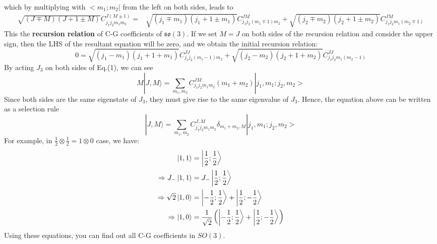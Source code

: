 \documentclass{article}
\begin{document}
	which by multiplying with $< m_{1} ;m_{2}| $ from the left on both sides, leads to
	\begin{equation*}
		\begin{aligned}
			\sqrt{(J\mp M)(J+1\pm M)} C_{j_{1} j_{2} m_{1} m_{2}}^{J(M\pm 1)} = & \sqrt{( j_{1} \mp m_{1})( j_{1} +1\pm m_{1})} C_{j_{1} j_{2}( m_{1} \mp 1) m_{2}}^{JM} +\sqrt{( j_{2} \mp m_{2})( j_{2} +1\pm m_{2})} C_{j_{1} j_{2} m_{1}( m_{2} \mp 1)}^{JM}
		\end{aligned}
	\end{equation*}
	This the \textbf{recursion relation} of C-G coefficients of $\mathfrak{so}( 3)$. If we set $M=J$ on both sides of the recursion relation and consider the upper sign, then the LHS of the resultant equation will be zero, and we obtain the initial recursion relation:
	\begin{equation*}
		0=\sqrt{( j_{1} -m_{1})( j_{1} +1+m_{1})} C_{j_{1} j_{2}( m_{1} -1) m_{2}}^{JJ} +\sqrt{( j_{2} -m_{2})( j_{2} +1+m_{2})} C_{j_{1} j_{2} m_{1}( m_{2} -1)}^{JJ}
	\end{equation*}
	By acting $J_{3}$ on both sides of Eq.(1), we can see
	\begin{equation*}
		M|J,M\rangle =\sum _{m_{1} ,m_{2}} C_{j_{1} j_{2} m_{1} m_{2}}^{JM}( m_{1} +m_{2})| j_{1} ,m_{1} ;j_{2} ,m_{2}> 
	\end{equation*}
	Since both sides are the same eigenstate of $J_{3}$, they must give rise to the same eigenvalue of $J_{3}$. Hence, the equation above can be written as a selection rule
	\begin{equation*}
		|J,M\rangle =\sum _{m_{1} ,m_{2}} C_{j_{1} j_{2} m_{1} m_{2}}^{J,M} \delta _{m_{1} +m_{2} ,M}| j_{1} ,m_{1} ;j_{2} ,m_{2}> 
	\end{equation*}
	For example, in $\frac{1}{2} \otimes \frac{1}{2} =1\otimes 0$ case, we have:
	\begin{equation*}
		\begin{aligned}
			\ket{1,1} & =\ket{\frac{1}{2} ;\frac{1}{2}}\\
			\Rightarrow J_{-}\ket{1,1} & =J_{-}\ket{\frac{1}{2} ;\frac{1}{2}}\\
			\Rightarrow \sqrt{2}\ket{1,0} & =\ket{-\frac{1}{2} ;\frac{1}{2}} +\ket{\frac{1}{2} ;-\frac{1}{2}}\\
			\Rightarrow \ket{1,0} & =\frac{1}{\sqrt{2}}\left(\ket{-\frac{1}{2} ;\frac{1}{2}} +\ket{\frac{1}{2} ;-\frac{1}{2}}\right)
		\end{aligned}
	\end{equation*}
	Using these equations, you can find out all C-G coefficients in $SO( 3)$. 
\end{document}
